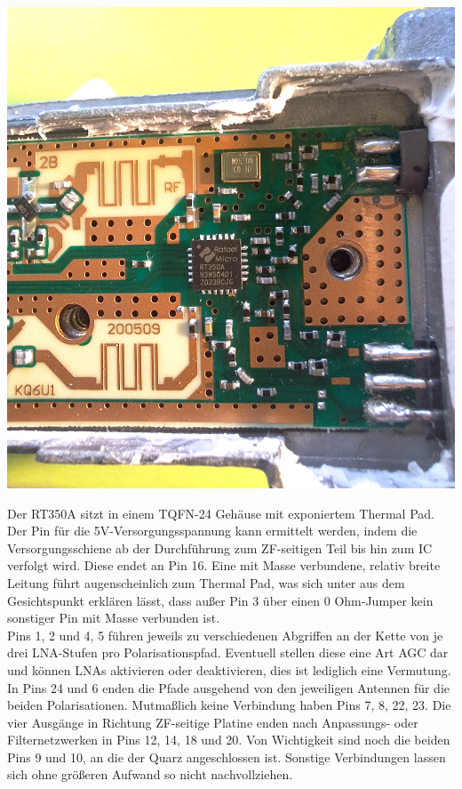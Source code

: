 \documentclass[]{article}
\begin{document}
		\vspace{2ex}
		\begin{center}
			\begin{minipage}{0.9\textwidth}
				\centering
				\includegraphics[width=\textwidth, trim=0 2cm 0 4cm, clip]{./img/20250531_150421.jpg}
			\end{minipage}
		\end{center}
		\vspace{2ex}
		
		
		\noindent Der RT350A sitzt in einem TQFN-24 Gehäuse mit exponiertem Thermal Pad. Der Pin für die 5V-Versorgungsspannung kann ermittelt werden, indem die Versorgungsschiene ab der Durchführung zum ZF-seitigen Teil bis hin zum IC verfolgt wird. Diese endet an Pin 16. Eine mit Masse verbundene, relativ breite Leitung führt augenscheinlich zum Thermal Pad, was sich unter aus dem Gesichtspunkt erklären lässt, dass außer Pin 3 über einen 0 Ohm-Jumper kein sonstiger Pin mit Masse verbunden ist.\\
		
		\noindent Pins 1, 2 und 4, 5 führen jeweils zu verschiedenen Abgriffen an der Kette von je drei LNA-Stufen pro Polarisationspfad. Eventuell stellen diese eine Art AGC dar und können LNAs aktivieren oder deaktivieren, dies ist lediglich eine Vermutung. In Pins 24 und 6 enden die Pfade ausgehend von den jeweiligen Antennen für die beiden Polarisationen. Mutmaßlich keine Verbindung haben Pins 7, 8, 22, 23. Die vier Ausgänge in Richtung ZF-seitige Platine enden nach Anpassungs- oder Filternetzwerken in Pins 12, 14, 18 und 20. Von Wichtigkeit sind noch die beiden Pins 9 und 10, an die der Quarz angeschlossen ist. Sonstige Verbindungen lassen sich ohne größeren Aufwand so nicht nachvollziehen.
	
\end{document}
